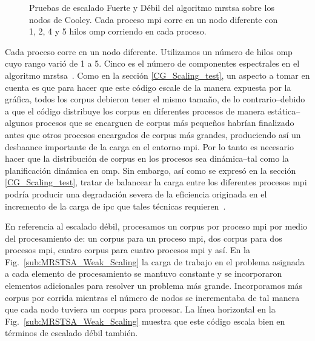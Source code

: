 {\begin{figure}[tb]
    \hfill
	\caption{Pruebas de escalado Fuerte y Débil del algoritmo \gls{mrstsa} sobre los nodos de Cooley. Cada proceso \gls{mpi} corre en un nodo diferente con 1, 2, 4 y 5 hilos \gls{omp} corriendo en cada proceso.}
  \label{fig:MRSTSA_Scaling} 
\end{figure}

Cada proceso corre en un nodo diferente. Utilizamos un número de hilos \gls{omp} cuyo rango varió de 1 a 5.
Cinco es el número de componentes espectrales en el algoritmo \gls{mrstsa}~\cite{10.1371/journal.pone.0217966}.
Como en la sección \ref{CG_Scaling_test}, un aspecto a tomar en cuenta es que para hacer que este código escale de la manera expuesta por la gráfica, todos los corpus debieron tener el mismo tamaño, de lo contrario--debido a que el código distribuye los corpus en diferentes procesos de manera estática--algunos procesos que se encarguen de corpus más pequeños habrían finalizado antes que otros procesos encargados de corpus más grandes, produciendo así un desbaance importante de la carga en el entorno \gls{mpi}.
Por lo tanto es necesario hacer que la distribución de corpus en los procesos sea dinámica--tal como la planificación dinámica en \gls{omp}.
Sin embargo, así como se expresó en la sección \ref{CG_Scaling_test}, tratar de balancear la carga entre los diferentes procesos \gls{mpi} podría producir una degradación severa de la eficiencia originada en el incremento de la carga de \gls{ipc} que tales técnicas requieren~\cite{hu2012biophysically}.

En referencia al escalado débil, procesamos un corpus por proceso \gls{mpi} por medio del procesamiento de: un corpus para un proceso \gls{mpi}, dos corpus para dos procesos \gls{mpi}, cuatro corpus para cuatro procesos \gls{mpi} y así.
En la Fig.~\ref{sub:MRSTSA_Weak_Scaling} la carga de trabajo en el problema asignada a cada elemento de procesamiento se mantuvo constante y se incorporaron elementos adicionales para resolver un problema más grande.
Incorporamos más corpus por corrida mientras el número de nodos se incrementaba de tal manera que cada nodo tuviera un corpus para procesar.
La línea horizontal en la Fig.~\ref{sub:MRSTSA_Weak_Scaling} muestra que este código escala bien en términos de escalado débil también.

}
